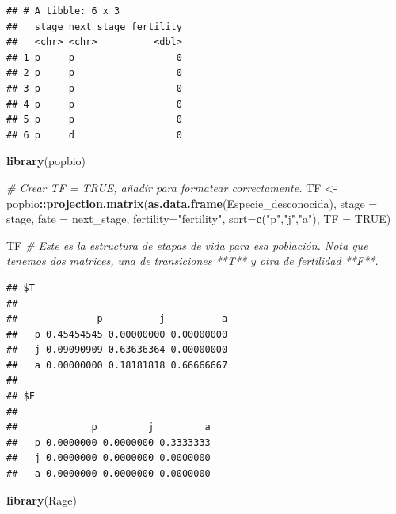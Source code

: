 \documentclass[
]{book}
\newenvironment{Shaded}{\begin{snugshade}}{\end{snugshade}}
\newcommand{\AttributeTok}[1]{\textcolor[rgb]{0.13,0.29,0.53}{#1}}
\newcommand{\CommentTok}[1]{\textcolor[rgb]{0.56,0.35,0.01}{\textit{#1}}}
\newcommand{\ConstantTok}[1]{\textcolor[rgb]{0.56,0.35,0.01}{#1}}
\newcommand{\FunctionTok}[1]{\textcolor[rgb]{0.13,0.29,0.53}{\textbf{#1}}}
\newcommand{\NormalTok}[1]{#1}
\newcommand{\OtherTok}[1]{\textcolor[rgb]{0.56,0.35,0.01}{#1}}
\newcommand{\SpecialCharTok}[1]{\textcolor[rgb]{0.81,0.36,0.00}{\textbf{#1}}}
\newcommand{\StringTok}[1]{\textcolor[rgb]{0.31,0.60,0.02}{#1}}
\theoremstyle{definition}
\theoremstyle{definition}
\theoremstyle{definition}
\theoremstyle{definition}
\theoremstyle{remark}
\begin{document}
\begin{verbatim}
## # A tibble: 6 x 3
##   stage next_stage fertility
##   <chr> <chr>          <dbl>
## 1 p     p                  0
## 2 p     p                  0
## 3 p     p                  0
## 4 p     p                  0
## 5 p     p                  0
## 6 p     d                  0
\end{verbatim}

\begin{Shaded}
\begin{Highlighting}[]
\FunctionTok{library}\NormalTok{(popbio)}

\CommentTok{\# Crear TF = TRUE, añadir para formatear correctamente.}
\NormalTok{TF }\OtherTok{\textless{}{-}}\NormalTok{ popbio}\SpecialCharTok{::}\FunctionTok{projection.matrix}\NormalTok{(}\FunctionTok{as.data.frame}\NormalTok{(Especie\_desconocida), }
                                \AttributeTok{stage =}\NormalTok{ stage, }\AttributeTok{fate =}\NormalTok{ next\_stage, }
                                \AttributeTok{fertility=}\StringTok{"fertility"}\NormalTok{, }\AttributeTok{sort=}\FunctionTok{c}\NormalTok{(}\StringTok{"p"}\NormalTok{,}\StringTok{"j"}\NormalTok{,}\StringTok{"a"}\NormalTok{), }\AttributeTok{TF =} \ConstantTok{TRUE}\NormalTok{)}

\NormalTok{TF }\CommentTok{\# Este es la estructura de etapas de vida para esa población.  Nota que tenemos dos matrices, una de transiciones **T** y otra de fertilidad **F**. }
\end{Highlighting}
\end{Shaded}

\begin{verbatim}
## $T
##    
##              p          j          a
##   p 0.45454545 0.00000000 0.00000000
##   j 0.09090909 0.63636364 0.00000000
##   a 0.00000000 0.18181818 0.66666667
## 
## $F
##    
##             p         j         a
##   p 0.0000000 0.0000000 0.3333333
##   j 0.0000000 0.0000000 0.0000000
##   a 0.0000000 0.0000000 0.0000000
\end{verbatim}

\begin{Shaded}
\begin{Highlighting}[]
\FunctionTok{library}\NormalTok{(Rage)}
\end{Highlighting}
\end{Shaded}

\begin{Shaded}
\end{Shaded}
\end{document}
